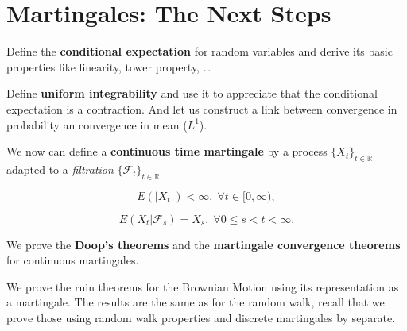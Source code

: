 \section{Martingales: The Next Steps}

Define the \textbf{conditional expectation} for random variables and derive its basic properties like linearity, tower property, \dots

Define \textbf{uniform integrability} and use it to appreciate that the conditional expectation is a contraction.
And let us construct a link between convergence in probability an convergence in mean ($L^1$).

We now can define a \textbf{continuous time martingale} by a process $\{X_t\}_{t \in \mathbb{R}}$ adapted to a \textit{filtration} $\{\mathcal{F}_t\}_{t \in \mathbb{R}}$

\begin{equation}
    E(|X_t|) < \infty, \; \forall t \in [0, \infty),
\end{equation}

\begin{equation}
    E(X_t | \mathcal{F}_s) = X_s, \; \forall 0 \leq s < t < \infty.
\end{equation}

We prove the \textbf{Doop's theorems} and the \textbf{martingale convergence theorems} for continuous martingales.

We prove the ruin theorems for the Brownian Motion using its representation as a martingale.
The results are the same as for the random walk, recall that we prove those using random walk properties and discrete martingales by separate.
